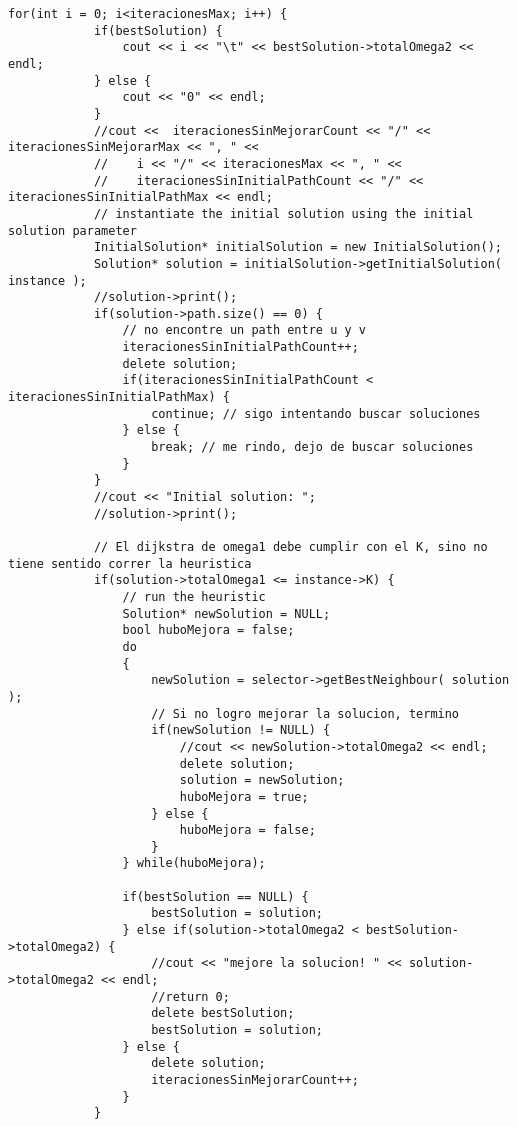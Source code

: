\begin{lstlisting}[caption=grasp.cpp]
        for(int i = 0; i<iteracionesMax; i++) {  
            if(bestSolution) {
                cout << i << "\t" << bestSolution->totalOmega2 << endl;
            } else {
                cout << "0" << endl;
            }
            //cout <<  iteracionesSinMejorarCount << "/" << iteracionesSinMejorarMax << ", " <<
            //    i << "/" << iteracionesMax << ", " << 
            //    iteracionesSinInitialPathCount << "/" << iteracionesSinInitialPathMax << endl;
            // instantiate the initial solution using the initial solution parameter
            InitialSolution* initialSolution = new InitialSolution();              
            Solution* solution = initialSolution->getInitialSolution( instance );                     
            //solution->print();                  
            if(solution->path.size() == 0) {
                // no encontre un path entre u y v
                iteracionesSinInitialPathCount++;
                delete solution;            
                if(iteracionesSinInitialPathCount < iteracionesSinInitialPathMax) {
                    continue; // sigo intentando buscar soluciones
                } else {
                    break; // me rindo, dejo de buscar soluciones
                }            
            }                        
            //cout << "Initial solution: ";
            //solution->print();

            // El dijkstra de omega1 debe cumplir con el K, sino no tiene sentido correr la heuristica            
            if(solution->totalOmega1 <= instance->K) {                               
                // run the heuristic
                Solution* newSolution = NULL;    
                bool huboMejora = false;
                do
                {                                        
                    newSolution = selector->getBestNeighbour( solution );                                                            
                    // Si no logro mejorar la solucion, termino      
                    if(newSolution != NULL) {                        
                        //cout << newSolution->totalOmega2 << endl; 
                        delete solution;
                        solution = newSolution;          
                        huboMejora = true;                          
                    } else {                      
                        huboMejora = false;
                    }        
                } while(huboMejora);

                if(bestSolution == NULL) {
                    bestSolution = solution;
                } else if(solution->totalOmega2 < bestSolution->totalOmega2) {
                    //cout << "mejore la solucion! " << solution->totalOmega2 << endl;
                    //return 0;
                    delete bestSolution;
                    bestSolution = solution;
                } else {
                    delete solution;
                    iteracionesSinMejorarCount++;      
                }            
            }       


\end{lstlisting}
